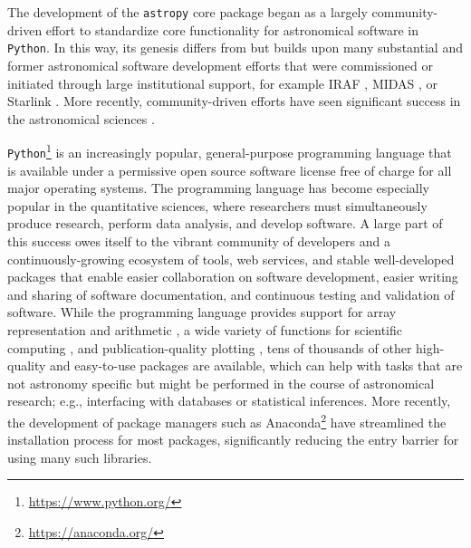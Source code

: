 \documentclass[modern]{aastex61}
\newcommand{\package}[1]{\texttt{#1}\xspace}
\newcommand{\python}{\package{Python}}
\newcommand{\astropypkg}{\package{astropy}}
\newcommand{\inlinecomment}[2]{\todo[inline]{#1: #2}\xspace}
\begin{document}

The development of the \astropypkg core package began as a largely
community-driven effort to standardize core functionality for astronomical
software in \python.
In this way, its genesis differs from but builds upon many substantial and
%
%
%
former astronomical software development efforts that were commissioned or
initiated through large institutional support, for example IRAF \citep[developed
at NOAO;][]{IRAF}, MIDAS \citep[developed at ESO;][]{MIDAS}, or Starlink
\citep[originally developed by a consortium of UK institutions and now
maintained by the East Asian Observatory;][]{starlink1982,starlink2013}.
More recently, community-driven efforts have seen significant success in the astronomical sciences \citep{yt}.

\python\footnote{\url{https://www.python.org/}} is an increasingly popular, general-purpose
programming language that is available under a permissive open source software license free of
charge for all major operating systems. The programming language has become especially popular
in the quantitative sciences, where researchers must simultaneously produce research, perform
data analysis, and develop software. A large part of this success owes itself to the vibrant
community of developers and a continuously-growing ecosystem of tools, web services, and stable
well-developed packages that enable easier collaboration on software development, easier
writing and sharing of software documentation, and continuous testing and validation of
software. While the programming language provides support for array representation and
arithmetic \citep[\package{numpy};][]{numpy}, a wide variety of functions for scientific
computing \citep[\package{scipy};][]{scipy}, and publication-quality plotting
\citep[\package{matplotlib};][]{matplotlib}, tens of thousands of other high-quality and easy-to-use
packages are available, which can help with tasks that are not astronomy specific but
might be performed in the course of astronomical research; e.g., interfacing with
databases or statistical inferences. More recently, the development of package managers such as
Anaconda\footnote{\url{https://anaconda.org/}} have streamlined the installation process for
most packages, significantly reducing the entry barrier for using many such libraries.
\end{document}
